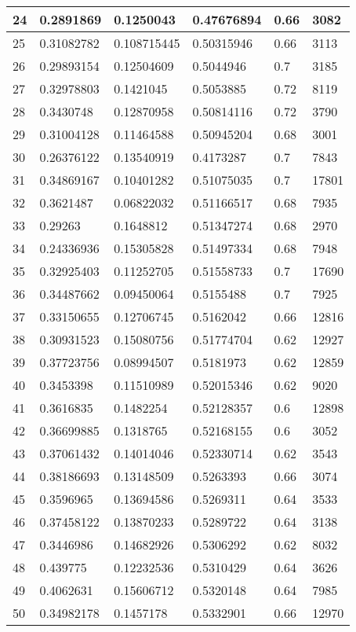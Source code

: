 \begin{longtable}{|l|l|l|l|l|l|}
24 & 0.2891869 & 0.1250043 & 0.47676894 & 0.66 & 3082 \\ \hline 
25 & 0.31082782 & 0.108715445 & 0.50315946 & 0.66 & 3113 \\ \hline 
26 & 0.29893154 & 0.12504609 & 0.5044946 & 0.7 & 3185 \\ \hline 
27 & 0.32978803 & 0.1421045 & 0.5053885 & 0.72 & 8119 \\ \hline 
28 & 0.3430748 & 0.12870958 & 0.50814116 & 0.72 & 3790 \\ \hline 
29 & 0.31004128 & 0.11464588 & 0.50945204 & 0.68 & 3001 \\ \hline 
30 & 0.26376122 & 0.13540919 & 0.4173287 & 0.7 & 7843 \\ \hline 
31 & 0.34869167 & 0.10401282 & 0.51075035 & 0.7 & 17801 \\ \hline 
32 & 0.3621487 & 0.06822032 & 0.51166517 & 0.68 & 7935 \\ \hline 
33 & 0.29263 & 0.1648812 & 0.51347274 & 0.68 & 2970 \\ \hline 
34 & 0.24336936 & 0.15305828 & 0.51497334 & 0.68 & 7948 \\ \hline 
35 & 0.32925403 & 0.11252705 & 0.51558733 & 0.7 & 17690 \\ \hline 
36 & 0.34487662 & 0.09450064 & 0.5155488 & 0.7 & 7925 \\ \hline 
37 & 0.33150655 & 0.12706745 & 0.5162042 & 0.66 & 12816 \\ \hline 
38 & 0.30931523 & 0.15080756 & 0.51774704 & 0.62 & 12927 \\ \hline 
39 & 0.37723756 & 0.08994507 & 0.5181973 & 0.62 & 12859 \\ \hline 
40 & 0.3453398 & 0.11510989 & 0.52015346 & 0.62 & 9020 \\ \hline 
41 & 0.3616835 & 0.1482254 & 0.52128357 & 0.6 & 12898 \\ \hline 
42 & 0.36699885 & 0.1318765 & 0.52168155 & 0.6 & 3052 \\ \hline 
43 & 0.37061432 & 0.14014046 & 0.52330714 & 0.62 & 3543 \\ \hline 
44 & 0.38186693 & 0.13148509 & 0.5263393 & 0.66 & 3074 \\ \hline 
45 & 0.3596965 & 0.13694586 & 0.5269311 & 0.64 & 3533 \\ \hline 
46 & 0.37458122 & 0.13870233 & 0.5289722 & 0.64 & 3138 \\ \hline 
47 & 0.3446986 & 0.14682926 & 0.5306292 & 0.62 & 8032 \\ \hline 
48 & 0.439775 & 0.12232536 & 0.5310429 & 0.64 & 3626 \\ \hline 
49 & 0.4062631 & 0.15606712 & 0.5320148 & 0.64 & 7985 \\ \hline 
50 & 0.34982178 & 0.1457178 & 0.5332901 & 0.66 & 12970 \\ \hline 
\end{longtable}